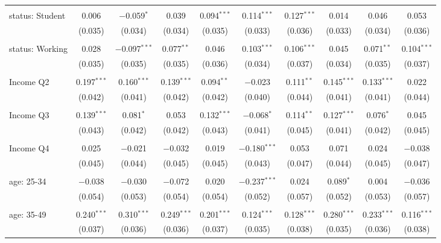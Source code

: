 \begin{tabular}{@{\extracolsep{5pt}}lccccccccc}
  & & & & & & & & & \\ 
 status: Student & 0.006 & $-$0.059$^{*}$ & 0.039 & 0.094$^{***}$ & 0.114$^{***}$ & 0.127$^{***}$ & 0.014 & 0.046 & 0.053 \\ 
  & (0.035) & (0.034) & (0.034) & (0.035) & (0.033) & (0.036) & (0.033) & (0.034) & (0.036) \\ 
  & & & & & & & & & \\ 
 status: Working & 0.028 & $-$0.097$^{***}$ & 0.077$^{**}$ & 0.046 & 0.103$^{***}$ & 0.106$^{***}$ & 0.045 & 0.071$^{**}$ & 0.104$^{***}$ \\ 
  & (0.035) & (0.035) & (0.035) & (0.036) & (0.034) & (0.037) & (0.034) & (0.035) & (0.037) \\ 
  & & & & & & & & & \\ 
 Income Q2 & 0.197$^{***}$ & 0.160$^{***}$ & 0.139$^{***}$ & 0.094$^{**}$ & $-$0.023 & 0.111$^{**}$ & 0.145$^{***}$ & 0.133$^{***}$ & 0.022 \\ 
  & (0.042) & (0.041) & (0.042) & (0.042) & (0.040) & (0.044) & (0.041) & (0.041) & (0.044) \\ 
  & & & & & & & & & \\ 
 Income Q3 & 0.139$^{***}$ & 0.081$^{*}$ & 0.053 & 0.132$^{***}$ & $-$0.068$^{*}$ & 0.114$^{**}$ & 0.127$^{***}$ & 0.076$^{*}$ & 0.045 \\ 
  & (0.043) & (0.042) & (0.042) & (0.043) & (0.041) & (0.045) & (0.041) & (0.042) & (0.045) \\ 
  & & & & & & & & & \\ 
 Income Q4 & 0.025 & $-$0.021 & $-$0.032 & 0.019 & $-$0.180$^{***}$ & 0.053 & 0.071 & 0.024 & $-$0.038 \\ 
  & (0.045) & (0.044) & (0.045) & (0.045) & (0.043) & (0.047) & (0.044) & (0.045) & (0.047) \\ 
  & & & & & & & & & \\ 
 age: 25-34 & $-$0.038 & $-$0.030 & $-$0.072 & 0.020 & $-$0.237$^{***}$ & 0.024 & 0.089$^{*}$ & 0.004 & $-$0.036 \\ 
  & (0.054) & (0.053) & (0.054) & (0.054) & (0.052) & (0.057) & (0.052) & (0.053) & (0.057) \\ 
  & & & & & & & & & \\ 
 age: 35-49 & 0.240$^{***}$ & 0.310$^{***}$ & 0.249$^{***}$ & 0.201$^{***}$ & 0.124$^{***}$ & 0.128$^{***}$ & 0.280$^{***}$ & 0.233$^{***}$ & 0.116$^{***}$ \\ 
  & (0.037) & (0.036) & (0.036) & (0.037) & (0.035) & (0.038) & (0.035) & (0.036) & (0.038) \\ 

\end{tabular}
